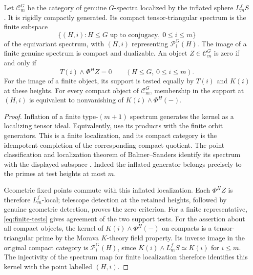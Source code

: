 \begin{proposition}\label{prop:finite-local}
Let \(\mathcal C_m^G\) be the category of genuine \(G\)-spectra localized by the inflated sphere \(L_m^fS\). It is rigidly compactly generated. Its compact tensor-triangular spectrum is the finite subspace
\[
 \{(H,i):H\le G\text{ up to conjugacy},\ 0\le i\le m\}
\]
of the equivariant spectrum, with \((H,i)\) representing \(\mathcal P_i^G(H)\). The image of a finite genuine spectrum is compact and dualizable. An object \(Z\in\mathcal C_m^G\) is zero if and only if
\[
 T(i)\wedge\Phi^H Z=0
 \qquad(H\le G,\ 0\le i\le m).
\]
For the image of a finite object, its support is tested equally by \(T(i)\) and \(K(i)\) at these heights.
For every compact object of \(\mathcal C_m^G\), membership in the support at
\((H,i)\) is equivalent to nonvanishing of \(K(i)\wedge\Phi^H(-)\).
\end{proposition}
\begin{proof}
Inflation of a finite type-\((m+1)\) spectrum generates the kernel as a localizing tensor ideal. Equivalently, use its products with the finite orbit generators. This is a finite localization, and its compact category is the idempotent completion of the corresponding compact quotient. The point classification and localization theorem of Balmer--Sanders identify its spectrum with the displayed subspace \cite[Theorems~4.9 and 4.14, Remark~5.3, and Proposition~5.24]{BS}. Indeed the inflated generator belongs precisely to the primes at test heights at most \(m\).

Geometric fixed points commute with this inflated localization. Each \(\Phi^H Z\) is therefore \(L_m^f\)-local; telescope detection at the retained heights, followed by genuine geometric detection, proves the zero criterion. For a finite representative, \eqref{eq:finite-tests} gives agreement of the two support tests.
For the assertion about all compact objects, the kernel of
\(K(i)\wedge\Phi^H(-)\) on compacts is a tensor-triangular prime by the
Morava \(K\)-theory field property. Its inverse image in the original compact
category is \(\mathcal P_i^G(H)\), since \(K(i)\wedge L_m^fS\simeq K(i)\)
for \(i\le m\). The injectivity of the spectrum map for finite localization
therefore identifies this kernel with the point labelled \((H,i)\).
\end{proof}
